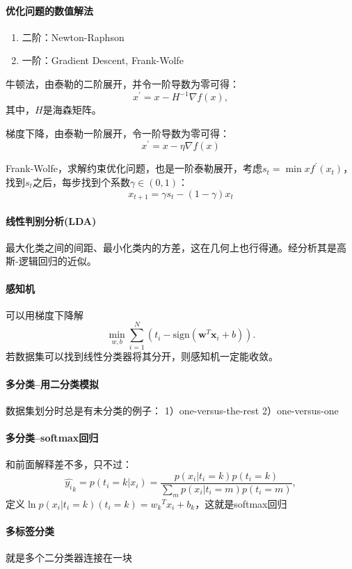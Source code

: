 \paragraph{优化问题的数值解法} 
\begin{enumerate}
    \item 二阶：Newton-Raphson
    \item 一阶：Gradient Descent, Frank-Wolfe
\end{enumerate}

牛顿法，由泰勒的二阶展开，并令一阶导数为零可得：
$$x^{\prime} = x - H^{-1}\nabla f(x),$$
其中，$H$是海森矩阵。

梯度下降，由泰勒一阶展开，令一阶导数为零可得：
$$x^{\prime} = x -\eta\nabla{}f(x)$$

Frank-Wolfe，求解约束优化问题，也是一阶泰勒展开，考虑$s_t = \min xf^\prime(x_t)$，找到$s_t$之后，每步找到个系数$\gamma \in (0,1)$：
$$x_{t+1} = \gamma s_t - (1-\gamma)x_t$$

\paragraph{线性判别分析(LDA)} 最大化类之间的间距、最小化类内的方差，这在几何上也行得通。经分析其是高斯-逻辑回归的近似。

\paragraph{感知机} 可以用梯度下降解
$$\min_{w,b} \sum_{i=1}^N (t_i - \mathrm{sign}(\bm w^T\bm x_i + b)).$$
若数据集可以找到线性分类器将其分开，则感知机一定能收敛。

\paragraph{多分类--用二分类模拟}数据集划分时总是有未分类的例子：
1）one-versus-the-rest
2）one-versus-one


\paragraph{多分类--softmax回归} 
和前面解释差不多，只不过：
$$\hat{y_i}_k = p(t_i = k|x_i) = \frac{p(x_i|t_i = k)p(t_i = k)}{\sum_m p(x_i|t_i = m)p(t_i = m)},$$
定义$\ln p(x_i|t_i = k)(t_i = k) = {w_k}^Tx_i + b_k$，这就是softmax回归

\paragraph{多标签分类} 就是多个二分类器连接在一块

